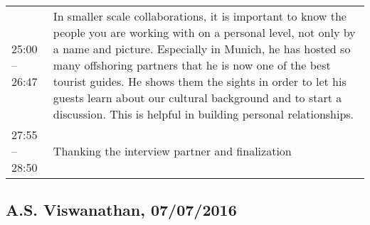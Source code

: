 \begin{appendix}
\begin{longtable}{l p{12.5cm}}
		25:00 -- 26:47&In smaller scale collaborations, it is important to know the people you are working with on a personal level, not only by a name and picture. Especially in Munich, he has hosted so many offshoring partners that he is now one of the best tourist guides. He shows them the sights in order to let his guests learn about our cultural background and to start a discussion. This is helpful in building personal relationships.\\
		27:55 -- 28:50&Thanking the interview partner and finalization\\
		
\end{longtable}

\tocless\subsection{A.S. Viswanathan, 07/07/2016}



\end{appendix}
